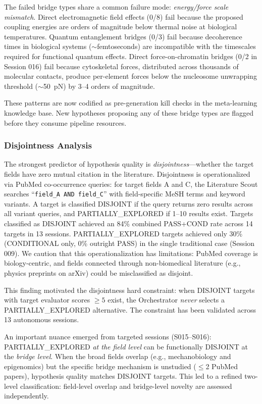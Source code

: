 The failed bridge types share a common failure mode: \emph{energy/force scale mismatch}. Direct electromagnetic field effects (0/8) fail because the proposed coupling energies are orders of magnitude below thermal noise at biological temperatures. Quantum entanglement bridges (0/3) fail because decoherence times in biological systems ($\sim$femtoseconds) are incompatible with the timescales required for functional quantum effects. Direct force-on-chromatin bridges (0/2 in Session 016) fail because cytoskeletal forces, distributed across thousands of molecular contacts, produce per-element forces below the nucleosome unwrapping threshold ($\sim$50~pN) by 3--4 orders of magnitude.

These patterns are now codified as pre-generation kill checks in the meta-learning knowledge base. New hypotheses proposing any of these bridge types are flagged before they consume pipeline resources.

\subsubsection{Disjointness Analysis}

The strongest predictor of hypothesis quality is \emph{disjointness}---whether the target fields have zero mutual citation in the literature. Disjointness is operationalized via PubMed co-occurrence queries: for target fields A and C, the Literature Scout searches ``\texttt{field\_A AND field\_C}'' with field-specific MeSH terms and keyword variants. A target is classified DISJOINT if the query returns zero results across all variant queries, and PARTIALLY\_EXPLORED if 1--10 results exist. Targets classified as DISJOINT achieved an 84\% combined PASS+COND rate across 14 targets in 13 sessions. PARTIALLY\_EXPLORED targets achieved only 30\% (CONDITIONAL only, 0\% outright PASS) in the single traditional case (Session 009). We caution that this operationalization has limitations: PubMed coverage is biology-centric, and fields connected through non-biomedical literature (e.g., physics preprints on arXiv) could be misclassified as disjoint.

This finding motivated the disjointness hard constraint: when DISJOINT targets with target evaluator scores $\geq 5$ exist, the Orchestrator \emph{never} selects a PARTIALLY\_EXPLORED alternative. The constraint has been validated across 13 autonomous sessions.

An important nuance emerged from targeted sessions (S015--S016): PARTIALLY\_EXPLORED \emph{at the field level} can be functionally DISJOINT at the \emph{bridge level}. When the broad fields overlap (e.g., mechanobiology and epigenomics) but the specific bridge mechanism is unstudied ($\leq$2 PubMed papers), hypothesis quality matches DISJOINT targets. This led to a refined two-level classification: field-level overlap and bridge-level novelty are assessed independently.

